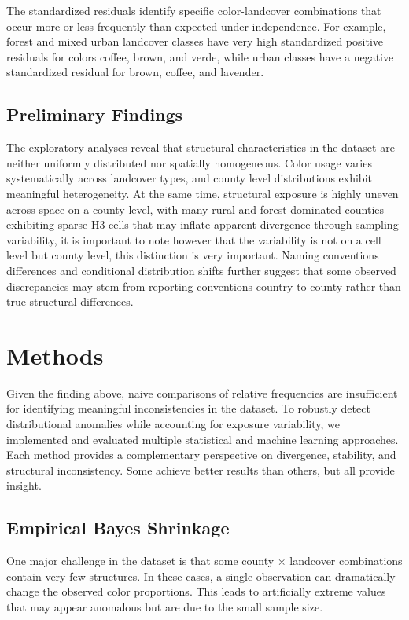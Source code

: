 \documentclass[11pt,letterpaper]{article}
\begin{document}
The standardized residuals identify specific color-landcover combinations that occur more or less frequently than expected under independence. For example, forest and mixed urban landcover classes have very high standardized positive residuals for colors coffee, brown, and verde, while urban classes have a negative standardized residual for brown, coffee, and lavender.

\subsection{Preliminary Findings}

The exploratory analyses reveal that structural characteristics in the dataset are neither uniformly distributed nor spatially homogeneous. Color usage varies systematically across landcover types, and county level distributions exhibit meaningful heterogeneity. At the same time, structural exposure is highly uneven across space on a county level, with many rural and forest dominated counties exhibiting sparse H3 cells that may inflate apparent divergence through sampling variability, it is important to note however that the variability is not on a cell level but county level, this distinction is very important. Naming conventions differences and conditional distribution shifts further suggest that some observed discrepancies may stem from reporting conventions country to county rather than true structural differences.

\section{Methods}

Given the finding above, naive comparisons of relative frequencies are insufficient for identifying meaningful inconsistencies in the dataset. To robustly detect distributional anomalies while accounting for exposure variability, we implemented and evaluated multiple statistical and machine learning approaches. Each method provides a complementary perspective on divergence, stability, and structural inconsistency. Some achieve better results than others, but all provide insight.

\subsection{Empirical Bayes Shrinkage}

One major challenge in the dataset is that some county × landcover combinations contain very few structures. In these cases, a single observation can dramatically change the observed color proportions. This leads to artificially extreme values that may appear anomalous but are due to the small sample size.
\end{document}
